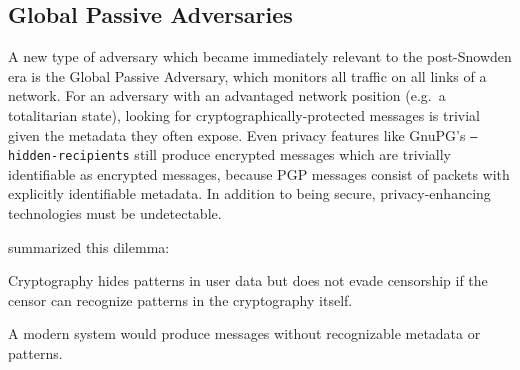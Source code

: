 \subsection{Global Passive Adversaries}\label{subsec:global-passive-adversaries}

A new type of adversary which became immediately relevant to the post-Snowden era is the Global
Passive Adversary, which monitors all traffic on all links of a network.
For an adversary with an advantaged network position (e.g.\ a totalitarian state), looking for
cryptographically-protected messages is trivial given the metadata they often expose.
Even privacy features like GnuPG's \texttt{--hidden-recipients} still produce encrypted messages
which are trivially identifiable as encrypted messages, because PGP messages consist of packets with
explicitly identifiable metadata. In addition to being secure, privacy-enhancing technologies must
be undetectable.

\textcite{bernstein2013} summarized this dilemma:

\begin{displayquote}
    Cryptography hides patterns in user data but does not evade censorship if the censor can
    recognize patterns in the cryptography itself.
\end{displayquote}

A modern system would produce messages without recognizable metadata or patterns.
